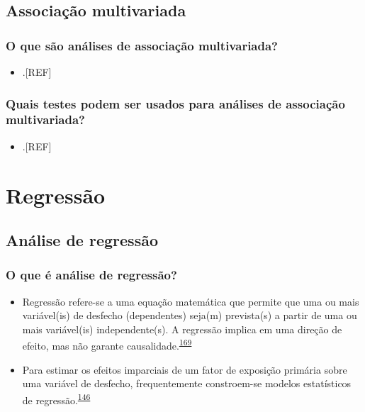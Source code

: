 \documentclass[
  a4paper,
]{book}
\providecommand{\tightlist}{%
  \setlength{\itemsep}{0pt}\setlength{\parskip}{0pt}}
\begin{document}
\hypertarget{multivariada}{%
\section{Associação multivariada}\label{multivariada}}

\hypertarget{o-que-suxe3o-anuxe1lises-de-associauxe7uxe3o-multivariada}{%
\subsection{O que são análises de associação multivariada?}\label{o-que-suxe3o-anuxe1lises-de-associauxe7uxe3o-multivariada}}

\begin{itemize}
\tightlist
\item
  .{[}REF{]}
\end{itemize}

\hypertarget{quais-testes-podem-ser-usados-para-anuxe1lises-de-associauxe7uxe3o-multivariada}{%
\subsection{Quais testes podem ser usados para análises de associação multivariada?}\label{quais-testes-podem-ser-usados-para-anuxe1lises-de-associauxe7uxe3o-multivariada}}

\begin{itemize}
\tightlist
\item
  .{[}REF{]}
\end{itemize}

\hypertarget{analise-inferencial-regressao}{%
\chapter{\texorpdfstring{\textbf{Regressão}}{Regressão}}\label{analise-inferencial-regressao}}

\hypertarget{analise-regressao}{%
\section{Análise de regressão}\label{analise-regressao}}

\hypertarget{o-que-uxe9-anuxe1lise-de-regressuxe3o}{%
\subsection{O que é análise de regressão?}\label{o-que-uxe9-anuxe1lise-de-regressuxe3o}}

\begin{itemize}
\item
  Regressão refere-se a uma equação matemática que permite que uma ou mais variável(is) de desfecho (dependentes) seja(m) prevista(s) a partir de uma ou mais variável(is) independente(s). A regressão implica em uma direção de efeito, mas não garante causalidade.\textsuperscript{\protect\hyperlink{ref-greenhalgh1997a}{169}}
\item
  Para estimar os efeitos imparciais de um fator de exposição primária sobre uma variável de desfecho, frequentemente constroem-se modelos estatísticos de regressão.\textsuperscript{\protect\hyperlink{ref-bandoli2018}{146}}
\end{itemize}
\end{document}
